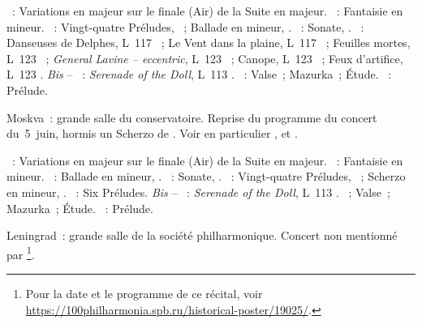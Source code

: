 \begin{description}
 \textsc{\Haendel{}}~: Variations en \kE majeur sur le finale (Air) de la
 Suite  en \kE majeur.
 \textsc{\Mozart{}}~: Fantaisie en \kC mineur.
 \textsc{\Chopin{}}~: Vingt-quatre Préludes, ~; Ballade en \kF
 mineur, .
 \textsc{\Scriabine{}}~: Sonate, .
 \textsc{\Debussy{}}~: Danseuses de Delphes, L~117 ~; Le Vent dans
 la plaine, L~117 ~; Feuilles mortes, L~123 ~;
 \emph{General Lavine -- eccentric}, L~123 ~; Canope, L~123
 ~; Feux d'artifice, L~123 .
 \emph{Bis} -- \textsc{\Debussy{}}~: \emph{Serenade of the Doll}, L~113
 .
 \textsc{\Chopin{}}~: Valse~; Mazurka~; Étude.
 \textsc{\Scriabine{}}~: Prélude.
 \item[\DateWithWeekDay{1945-06-12}]
 Moskva~: grande salle du conservatoire.
 Reprise du programme du concert du~5~juin, hormis un Scherzo de \Chopin{}.
 Voir en particulier \citet[p.~442]{Milshteyn82a},
 \citet[p.~394]{Nikonovich08} et \citet{Lazarev20}.

 \textsc{\Haendel{}}~: Variations en \kE majeur sur le finale (Air) de la
 Suite  en \kE majeur.
 \textsc{\Mozart{}}~: Fantaisie en \kC mineur.
 \textsc{\Chopin{}}~: Ballade en \kF mineur, .
 \textsc{\Scriabine{}}~: Sonate, .
 \textsc{\Chopin{}}~: Vingt-quatre Préludes, ~; Scherzo en \kB
 \Flat mineur, .
 \textsc{\Debussy{}}~: Six Préludes.
 \emph{Bis} -- \textsc{\Debussy{}}~: \emph{Serenade of the Doll}, L~113
 .
 \textsc{\Chopin{}}~; Valse~; Mazurka~; Étude.
 \textsc{\Scriabine{}}~: Prélude.
 \item[\DateWithWeekDay{1945-06-22}]
 Leningrad~: grande salle de la société philharmonique.
 Concert non mentionné par \citet[p.~423]{Scriabine}%
 \footnote{Pour la date et le programme de ce récital, voir
 \href{https://100philharmonia.spb.ru/historical-poster/19025/}%
 {https://100philharmonia.spb.ru/historical-poster/19025/}.}.


\end{description}
